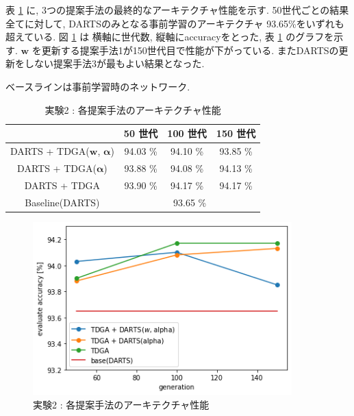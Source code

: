 表 \ref{tab:acc_ga} に, 3つの提案手法の最終的なアーキテクチャ性能を示す.
50世代ごとの結果全てに対して, DARTSのみとなる事前学習のアーキテクチャ 93.65\%をいずれも超えている.
図 \ref{fig:exp2/eval} は 横軸に世代数, 縦軸にaccuracyをとった,
表 \ref{tab:acc_ga} のグラフを示す.
$\bm{w}$ を更新する提案手法1が150世代目で性能が下がっている.
またDARTSの更新をしない提案手法3が最もよい結果となった.


\begin{table}[t]
  \begin{center}
    \caption{実験2 : 各提案手法のアーキテクチャ性能}
		\vspace{-1mm}
    ベースラインは事前学習時のネットワーク.
		\vspace{1mm}
		\vspace{3mm}
    \begin{tabular}{|c|c|c|c|} \hline
    \textbf{}       & \textbf{50 世代} & \textbf{100 世代} & \textbf{150 世代} \\ \hline\hline
    DARTS + TDGA($\bm{w}$, $\bm{\alpha}$)& 94.03 \%       & 94.10 \%        & 93.85 \%        \\ \hline
    DARTS + TDGA($\bm{\alpha}$)& 93.88 \%       & 94.08 \%        & 94.13 \%        \\ \hline
    DARTS + TDGA   & 93.90 \%       & 94.17 \%        & 94.17 \%        \\ \hline
    Baseline(DARTS) & \multicolumn{3}{c|}{93.65 \%}                      \\ \hline
    \end{tabular}
    \label{tab:acc_ga}
  \end{center}
\end{table}

\begin{figure}[t]
  \begin{center}
    \includegraphics[clip,width=10cm]{./fig/04.exp/eval.png}
  \end{center}
  \caption{実験2 : 各提案手法のアーキテクチャ性能}
  \label{fig:exp2/eval}
\end{figure}



